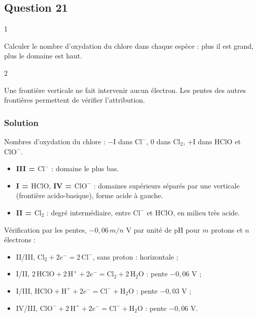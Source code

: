 \documentclass[11pt,a4paper]{article}
\providecommand{\tightlist}{\setlength{\itemsep}{0pt}\setlength{\parskip}{0pt}}
\begin{document}
\hypertarget{question-21}{%
\subsection{Question 21}\label{question-21}}

\begin{indication}{1}

Calculer le nombre d'oxydation du chlore dans chaque espèce : plus il est grand, plus le domaine est haut.

\end{indication}

\begin{indication}{2}

Une frontière verticale ne fait intervenir aucun électron. Les pentes des autres frontières permettent de vérifier l'attribution.

\end{indication}

\hypertarget{solution-20}{%
\subsubsection{Solution}\label{solution-20}}

Nombres d'oxydation du chlore : −I dans \(\mathrm{Cl^-}\), 0 dans \(\mathrm{Cl_2}\), +I dans \(\mathrm{HClO}\) et \(\mathrm{ClO^-}\).

\begin{itemize}
\tightlist
\item
  \textbf{III = \(\mathrm{Cl^-}\)} : domaine le plus bas.
\item
  \textbf{I = \(\mathrm{HClO}\)}, \textbf{IV = \(\mathrm{ClO^-}\)} : domaines supérieurs séparés par une verticale (frontière acido-basique), forme acide à gauche.
\item
  \textbf{II = \(\mathrm{Cl_2}\)} : degré intermédiaire, entre \(\mathrm{Cl^-}\) et \(\mathrm{HClO}\), en milieu très acide.
\end{itemize}

Vérification par les pentes, \(-0{,}06\,m/n\) V par unité de pH pour \(m\) protons et \(n\) électrons :

\begin{itemize}
\tightlist
\item
  II/III, \(\mathrm{Cl_2}+2e^-=2\,\mathrm{Cl^-}\), sans proton : horizontale ;
\item
  I/II, \(2\,\mathrm{HClO}+2\,\mathrm{H^+}+2e^-=\mathrm{Cl_2}+2\,\mathrm{H_2O}\) : pente \(-0{,}06\) V ;
\item
  I/III, \(\mathrm{HClO}+\mathrm{H^+}+2e^-=\mathrm{Cl^-}+\mathrm{H_2O}\) : pente \(-0{,}03\) V ;
\item
  IV/III, \(\mathrm{ClO^-}+2\,\mathrm{H^+}+2e^-=\mathrm{Cl^-}+\mathrm{H_2O}\) : pente \(-0{,}06\) V.
\end{itemize}
\end{document}

